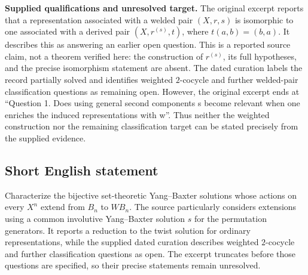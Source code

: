 \documentclass[11pt]{article}
\begin{document}
\textbf{Supplied qualifications and unresolved target.}
The original excerpt reports that a representation associated with a welded pair \((X,r,s)\) is isomorphic to one associated with a derived pair \((X,r^{(s)},t)\), where \(t(a,b)=(b,a)\). It describes this as answering an earlier open question. This is a reported source claim, not a theorem verified here: the construction of \(r^{(s)}\), its full hypotheses, and the precise isomorphism statement are absent. The dated curation labels the record partially solved and identifies weighted \(2\)-cocycle and further welded-pair classification questions as remaining open. However, the original excerpt ends at ``Question 1. Does using general second components s become relevant when one enriches the induced representations with w''. Thus neither the weighted construction nor the remaining classification target can be stated precisely from the supplied evidence.
\subsection{Short English statement}
Characterize the bijective set-theoretic Yang--Baxter solutions whose actions on every \(X^n\) extend from \(B_n\) to \(WB_n\). The source particularly considers extensions using a common involutive Yang--Baxter solution \(s\) for the permutation generators. It reports a reduction to the twist solution for ordinary representations, while the supplied dated curation describes weighted \(2\)-cocycle and further classification questions as open. The excerpt truncates before those questions are specified, so their precise statements remain unresolved.
\end{document}
